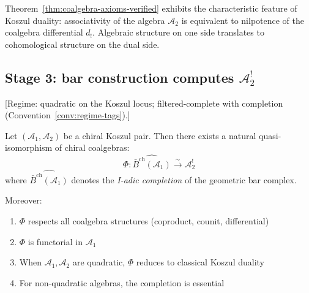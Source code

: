 \begin{remark}
Theorem~\ref{thm:coalgebra-axioms-verified} exhibits the characteristic feature of Koszul duality: associativity of the algebra $\mathcal{A}_2$ is equivalent to nilpotence of the coalgebra differential $d_!$. Algebraic structure on one side translates to cohomological structure on the dual side.
\end{remark}


\subsection{\texorpdfstring{Stage 3: bar construction computes $\mathcal{A}_2^!$}{Stage 3: bar construction computes A-2!}}

\begin{theorem}
\label{thm:bar-computes-koszul-dual-complete}
\label{thm:chiral-koszul-duality}
\textup{[Regime: quadratic on the Koszul locus;
filtered-complete with completion
\textup{(}Convention~\textup{\ref{conv:regime-tags})}.]}

Let $(\mathcal{A}_1, \mathcal{A}_2)$ be a chiral Koszul pair. Then there exists a natural quasi-isomorphism of chiral coalgebras:
\[\Phi: \widehat{\bar{B}^{\text{ch}}(\mathcal{A}_1)} \xrightarrow{\sim} \mathcal{A}_2^!\]
where $\widehat{\bar{B}^{\text{ch}}(\mathcal{A}_1)}$ denotes the \emph{I-adic completion} of the geometric bar complex.

Moreover:
\begin{enumerate}
\item $\Phi$ respects all coalgebra structures (coproduct, counit, differential)
\item $\Phi$ is functorial in $\mathcal{A}_1$
\item When $\mathcal{A}_1, \mathcal{A}_2$ are quadratic, $\Phi$ reduces to classical Koszul duality
\item For non-quadratic algebras, the completion is essential
\end{enumerate}
\end{theorem}

